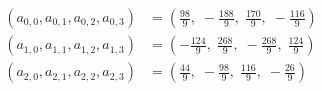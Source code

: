 \begin{align*}
(a_{0,0},a_{0,1},a_{0,2},a_{0,3})&=(\frac{98}{9},\;- \frac{188}{9},\;\frac{170}{9},\;- \frac{116}{9})\\
(a_{1,0},a_{1,1},a_{1,2},a_{1,3})&=(- \frac{124}{9},\;\frac{268}{9},\;- \frac{268}{9},\;\frac{124}{9})\\
(a_{2,0},a_{2,1},a_{2,2},a_{2,3})&=(\frac{44}{9},\;- \frac{98}{9},\;\frac{116}{9},\;- \frac{26}{9})
\end{align*}

